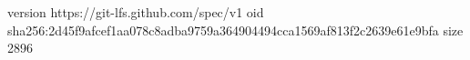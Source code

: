 version https://git-lfs.github.com/spec/v1
oid sha256:2d45f9afcef1aa078c8adba9759a364904494cca1569af813f2c2639e61e9bfa
size 2896
